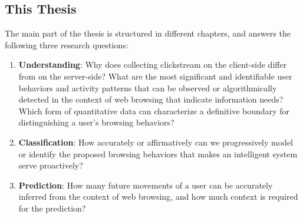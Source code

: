 \subsection{This Thesis}


The main part of the thesis is structured in different chapters, and answers the following
three research questions:

\begin{enumerate}
    \item \textbf{Understanding}: Why does collecting clickstream on the client-side differ 
        from on the server-side?
        What are the most significant and identifiable user behaviors and activity patterns 
        that can be observed or algorithmically detected in the context of web browsing that 
        indicate information needs?
        Which form of quantitative data can characterize a definitive boundary for 
        distinguishing a user's browsing behaviors?
    \item \textbf{Classification}: How accurately or affirmatively can we progressively model 
        or identify the proposed browsing behaviors that makes an intelligent system 
        serve proactively?
    \item \textbf{Prediction}: How many future movements of a user can be accurately inferred 
        from the context of web browsing, and how much context is required for the prediction?

\end{enumerate}

